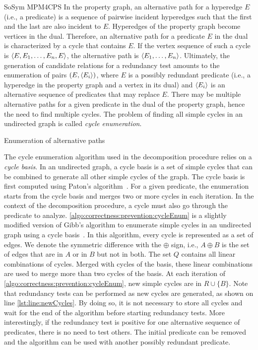 \begin{copiedFrom}{SoSym MPM4CPS}
In the property graph, an alternative path for a hyperedge $E$ (i.e., a predicate) is a sequence of pairwise incident hyperedges such that the first and the last are also incident to $E$. Hyperedges of the property graph become vertices in the dual. Therefore, an alternative path for a predicate $E$ in the dual is characterized by a cycle that contains $E$. If the vertex sequence of such a cycle is $\langle E, E_1, \dots, E_n, E \rangle$, the alternative path is $\langle E_1, \dots, E_n \rangle$. Ultimately, the generation of candidate relations for a redundancy test amounts to the enumeration of pairs $(E, \langle E_i \rangle)$, where $E$ is a possibly redundant predicate (i.e., a hyperedge in the property graph and a vertex in its dual) and $\langle E_i \rangle$ is an alternative sequence of predicates that may replace $E$. There may be multiple alternative paths for a given predicate in the dual of the property graph, hence the need to find multiple cycles. The problem of finding all simple cycles in an undirected graph is called \textit{cycle enumeration}.

\begin{algorithm}[b]
    
    \caption{Enumeration of alternative paths}
    \label{algo:correctness:prevention:cycleEnum}
\end{algorithm}

The cycle enumeration algorithm used in the decomposition procedure relies on a \textit{cycle basis}. In an undirected graph, a cycle basis is a set of simple cycles that can be combined to generate all other simple cycles of the graph. The cycle basis is first computed using Paton's algorithm~\cite{paton1969algorithm}. For a given predicate, the enumeration starts from the cycle basis and merges two or more cycles in each iteration. In the context of the decomposition procedure, a cycle must also go through the predicate to analyze. \autoref{algo:correctness:prevention:cycleEnum} is a slightly modified version of Gibb's algorithm to enumerate simple cycles in an undirected graph using a cycle basis~\cite{gibbs1969cycle}. In this algorithm, every cycle is represented as a set of edges. We denote the symmetric difference with the $\oplus$ sign, i.e., $A \oplus B$ is the set of edges that are in $A$ or in $B$ but not in both. The set $Q$ contains all linear combinations of cycles. Merged with cycles of the basis, these linear combinations are used to merge more than two cycles of the basis. At each iteration of \autoref{algo:correctness:prevention:cycleEnum}, new simple cycles are in $R \cup \{B\}$. Note that redundancy tests can be performed as new cycles are generated, as shown on line \ref{lst:line:newCycles}. By doing so, it is not necessary to store all cycles and wait for the end of the algorithm before starting redundancy tests. More interestingly, if the redundancy test is positive for one alternative sequence of predicates, there is no need to test others. The initial predicate can be removed and the algorithm can be used with another possibly redundant predicate. 
  

\end{copiedFrom}
